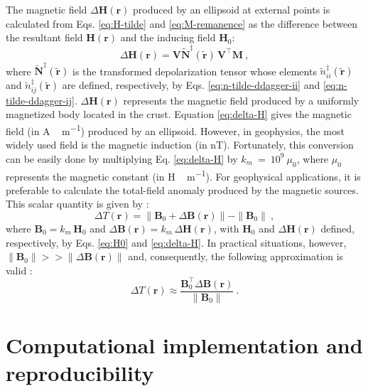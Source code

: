\documentclass[gmd, manuscript]{copernicus}
\begin{document}
The magnetic field $\Delta \mathbf{H}(\mathbf{r})$
produced by an ellipsoid at external points is calculated from
Eqs. \ref{eq:H-tilde} and \ref{eq:M-remanence} as the difference
between the resultant field $\mathbf{H}(\mathbf{r})$
and the inducing field $\mathbf{H}_{0}$:
\begin{equation}
\Delta \mathbf{H}(\mathbf{r}) =
\mathbf{V} \tilde{\mathbf{N}}^{\ddagger}(\tilde{\mathbf{r}}) \, \mathbf{V}^{\top}
\mathbf{M} \: ,
\label{eq:delta-H}
\end{equation}
where $\tilde{\mathbf{N}}^{\ddagger}(\tilde{\mathbf{r}})$ is
the transformed depolarization tensor whose elements
$\tilde{n}^{\ddagger}_{ii}(\tilde{\mathbf{r}})$ and
$\tilde{n}^{\ddagger}_{ij}(\tilde{\mathbf{r}})$ are defined,
respectively, by Eqs. \ref{eq:n-tilde-ddagger-ii} and
\ref{eq:n-tilde-ddagger-ij}.
$\Delta \mathbf{H}(\mathbf{r})$
represents the magnetic field produced by a uniformly magnetized
body located in the crust.
Equation \ref{eq:delta-H} gives the magnetic field
(in \unit{A \, m^{-1}}) produced by an ellipsoid. However,
in geophysics, the most widely used field is the magnetic
induction (in \unit{nT}). Fortunately, this conversion can
be easily done by multiplying Eq. \ref{eq:delta-H}
by $k_{m}~=~10^{9}~\mu_{0}$, where $\mu_{0}$ represents the
magnetic constant (in \unit{H \, m^{-1}}).
For geophysical applications, it is preferable to
calculate the total-field anomaly produced by the
magnetic sources. This scalar quantity is given by
\citep{blakely1996}:
\begin{equation}
\Delta T(\mathbf{r}) = \|
\mathbf{B}_{0} + \Delta \mathbf{B}(\mathbf{r}) \|
- \| \mathbf{B}_{0} \| \: ,
\label{eq:delta-T}
\end{equation}
where $\mathbf{B}_{0} = k_{m} \, \mathbf{H}_{0}$
and $\Delta \mathbf{B}(\mathbf{r}) =
k_{m} \, \Delta \mathbf{H}(\mathbf{r})$,
with $\mathbf{H}_{0}$ and $\Delta \mathbf{H}(\mathbf{r})$ defined,
respectively, by Eqs. \ref{eq:H0} and \ref{eq:delta-H}.
In practical situations, however,
$\| \mathbf{B}_{0} \| >> \| \Delta \mathbf{B}(\mathbf{r}) \|$
and, consequently, the following approximation is valid \citep{blakely1996}:
\begin{equation}
\Delta T(\mathbf{r}) \approx
\frac{\mathbf{B}_{0}^{\top} \Delta \mathbf{B}(\mathbf{r})}{\| \mathbf{B}_{0} \|} \: .
\label{eq:delta-T-approx}
\end{equation}


\section{Computational implementation and reproducibility}
\end{document}
